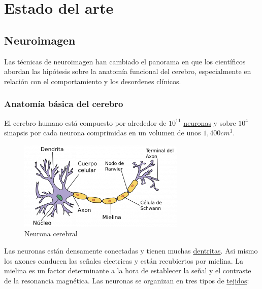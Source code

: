 \chapter{Estado del arte}

\section{Neuroimagen}

Las técnicas de neuroimagen han cambiado el panorama en que los científicos abordan las hipótesis sobre la anatomía funcional del cerebro, especialmente en relación con el comportamiento y los desordenes clínicos. \cite{bold_fmri}

\subsection{Anatomía básica del cerebro}

El cerebro humano está compuesto por alrededor de $10^{11}$ \hyperref[eda:neurona]{neuronas} y sobre $10^{4}$ sinapsis por cada neurona comprimidas en un volumen de unos $1,400cm^{3}$.

\begin{figure}[H]
  \centering
    \includegraphics[scale=0.75]{img/neurona.png}
  \caption{Neurona cerebral}\label{eda:neurona}
\end{figure}


Las neuronas están densamente conectadas y tienen muchas \hyperref[eda:neurona]{dentritas}. Asi mismo los axones conducen las señales electricas y están recubiertos por mielina. La mielina es un factor determinante a la hora de establecer la señal y el contraste de la resonancia magnética. Las neuronas se organizan en tres tipos de \hyperref[eda:tejidos]{tejidos}:

